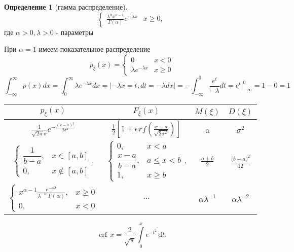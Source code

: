 \documentclass[a4paper]{article}
\theoremstyle{definition}
\newtheorem*{definition}{Определение}
\theoremstyle{remark}
\begin{document}
\begin{enumerate}
\begin{definition}[гамма распределение]
\[\begin{cases}
            \frac{\lambda^\alpha x^{\alpha-1}}{\Gamma(\alpha)}e^{-\lambda x} & x\ge 0,
        \end{cases}\]
        где $\alpha > 0, \lambda > 0$ - параметры
    \end{definition}
    При $\alpha = 1$ имеем показательное распределение
    \[p_\xi(x) = \begin{cases}
        0 & x< 0 \\
            \lambda e^{-\lambda x} & x\ge 0
    \end{cases}\]
    \[\int_{-\infty}^{\infty}p(x) dx  = \int_{0}^{\infty} \lambda e^{-\lambda x} dx = |-\lambda x = t, dt =  - \lambda dx| = -\int_{-\infty}^{0} \frac{e^t }{-\lambda} dt = e^t {|}_{-\infty}^0 = 1 - 0 = 1\]
\end{enumerate}
\begin{center}
    \begin{tabular}{ |c c c c| }
        \hline
        $p_\xi(x)$ & $F_\xi(x)$ & $M(\xi)$ & $D(\xi)$ \\ 
        \hline
        $\frac1{\sqrt{2\pi}\sigma} e^{-\frac{(x-a)^2}{2\sigma^2}}$ & $\frac12 [1 + erf(\frac{x-a}{\sqrt{2\sigma^2}})]$ & a  & $\sigma^2$\\ 
        
        ${\displaystyle\left\{{\begin{matrix}{\dfrac {1}{b-a}},&x\in [a,b]\\0,&x\not \in [a,b]\end{matrix}}\right..}$ &
        ${\displaystyle \left\{{\begin{matrix}0,&x<a\\{\dfrac {x-a}{b-a}},&a\leqslant x<b\\1,&x\geqslant b\end{matrix}}\right..}$ &
        $\frac{a+b}2$ & $\frac{{(b-a})^2}{12}$ \\


        $\displaystyle\left\{{\begin{matrix}x^{{\alpha-1}}{\frac  {e^{{-x\lambda }}}{\lambda ^{-\alpha}\,\Gamma (\alpha)}},&x\geq 0\\0,&x<0\end{matrix}}\right.$ & $\dots$ & $\alpha \lambda^{-1}$ & $\alpha \lambda^{-2}$ \\
        
     \hline
    \end{tabular}
    \end{center}
    \[\operatorname {erf}\,x={\frac  {2}{{\sqrt  {\pi }}}}\int \limits _{0}^{x}e^{{-t^{2}}}\,{\mathrm  d}t.\]
\end{document}
